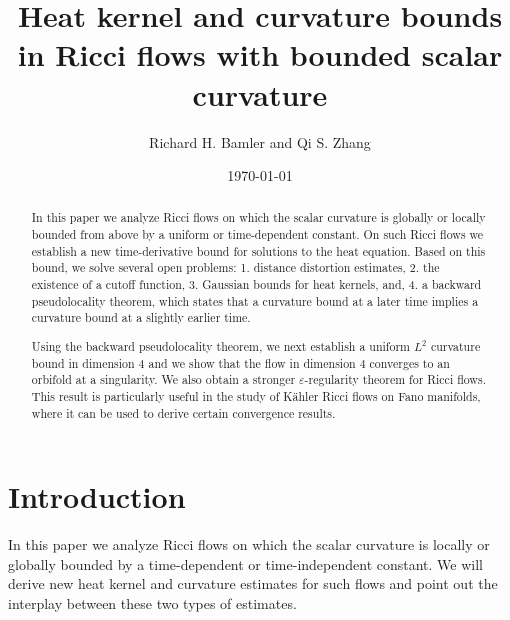 \documentclass[11pt]{amsart}
\numberwithin{equation}{section}
\def\eps{\varepsilon}
\def\eps{\varepsilon}
\numberwithin{equation}{section}
\begin{document}
\title[Heat kernel and curvature bounds in Ricci flows]{Heat kernel and curvature bounds in Ricci flows with bounded scalar curvature}
\author{Richard H. Bamler and Qi S. Zhang}
\address{Department of Mathematics, UC Berkeley, Berkeley, CA 94720,  USA}
\address{Department of Mathematics, University of California, Riverside, CA 92521, USA}
\date{\today}


\begin{abstract}
In this paper we analyze Ricci flows on which the scalar curvature is globally or locally bounded from above by a uniform or time-dependent constant.
On such Ricci flows we establish a new time-derivative bound for solutions to the heat equation.
Based on this bound, we solve several open problems: 1. distance distortion estimates, 2. the existence of a cutoff function, 3. Gaussian bounds for heat kernels, and, 4. a backward pseudolocality theorem, which states that a curvature bound at a later time implies a curvature bound at a slightly earlier time.

Using the backward pseudolocality theorem, we next establish a uniform $L^2$ curvature bound in dimension $4$ and we show that the flow in dimension $4$ converges to an orbifold at a singularity.
We also obtain a stronger $\eps$-regularity theorem for Ricci flows.
This result is particularly useful in the study of K\"ahler Ricci flows on Fano manifolds, where it can be used to derive certain convergence results.
\end{abstract}
\maketitle
\tableofcontents


\section{Introduction}
In this paper we analyze Ricci flows on which the scalar curvature is locally or globally bounded by a time-dependent or time-independent constant.
We will derive new heat kernel and curvature estimates for such flows and point out the interplay between these two types of estimates.
\end{document}
